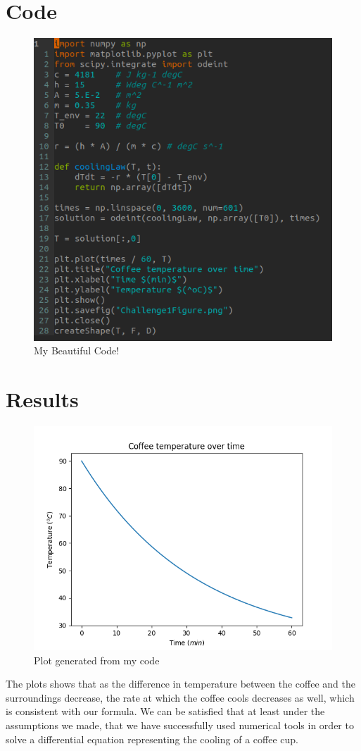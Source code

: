 \documentclass[12pt]{article}
\begin{document}
\section{Code}
\begin{figure}[H]
  \includegraphics[width=\linewidth]{CodeSnippetCC.png}
  \caption{My Beautiful Code!}
  \label{fig:mBC}
\end{figure}
\section{Results}
\begin{figure}[H]
  \includegraphics[width=\linewidth]{Challenge1Figure.png}
  \caption{Plot generated from my code}
  \label{fig:plt1}
\end{figure}
The plots shows that as the difference in temperature between the coffee and the surroundings decrease, the rate at which the coffee cools decreases as well, which is consistent with our formula. We can be satisfied that at least under the assumptions we made, that we have successfully used numerical tools in order to solve a differential equation representing the cooling of a coffee cup.
\end{document}

